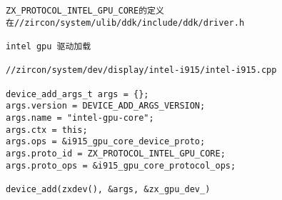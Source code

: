\begin{verbatim}
ZX_PROTOCOL_INTEL_GPU_CORE的定义在//zircon/system/ulib/ddk/include/ddk/driver.h

intel gpu 驱动加载

//zircon/system/dev/display/intel-i915/intel-i915.cpp

device_add_args_t args = {};
args.version = DEVICE_ADD_ARGS_VERSION;
args.name = "intel-gpu-core";
args.ctx = this;
args.ops = &i915_gpu_core_device_proto;
args.proto_id = ZX_PROTOCOL_INTEL_GPU_CORE;
args.proto_ops = &i915_gpu_core_protocol_ops;

device_add(zxdev(), &args, &zx_gpu_dev_)


\end{verbatim}
